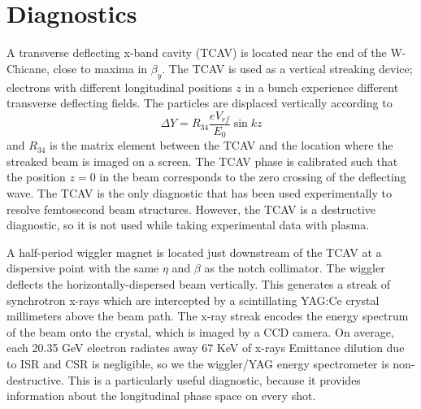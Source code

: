 \documentclass[%
twocolumn,
showpacs,preprintnumbers,
 aps,
prstab,
]{revtex4-1}
\begin{document}






\section{Diagnostics}\label{sec:diag}
A transverse deflecting x-band cavity (TCAV) is located near the end of the W-Chicane, close to maxima in $\beta_y$. The TCAV is used as a vertical streaking device; electrons with different longitudinal positions $z$ in a bunch experience different transverse deflecting fields. The particles are displaced vertically according to
\begin{equation}
\Delta Y = R_{34}\frac{e V_{rf}}{E_0}\sin{kz}
\end{equation}
and $R_{34}$ is the matrix element between the TCAV and the location where the streaked beam is imaged on a screen. The TCAV phase is calibrated such that the position $z=0$ in the beam corresponds to the zero crossing of the deflecting wave. The TCAV is the only diagnostic that has been used experimentally to resolve femtosecond beam structures. However, the TCAV is a destructive diagnostic, so it is not used while taking experimental data with plasma.

A half-period wiggler magnet is located just downstream of the TCAV at a dispersive point with the same $\eta$ and $\beta$ as the notch collimator. The wiggler deflects the horizontally-dispersed beam vertically. This generates a streak of synchrotron x-rays which are intercepted by a scintillating YAG:Ce crystal millimeters above the beam path. The x-ray streak encodes the energy spectrum of the beam onto the crystal, which is imaged by a CCD camera. On average, each 20.35 GeV electron radiates away 67 KeV of x-rays Emittance dilution due to ISR and CSR is negligible, so we the wiggler/YAG energy spectrometer is non-destructive. This is a particularly useful diagnostic, because it provides information about the longitudinal phase space on every shot.
\end{document}
